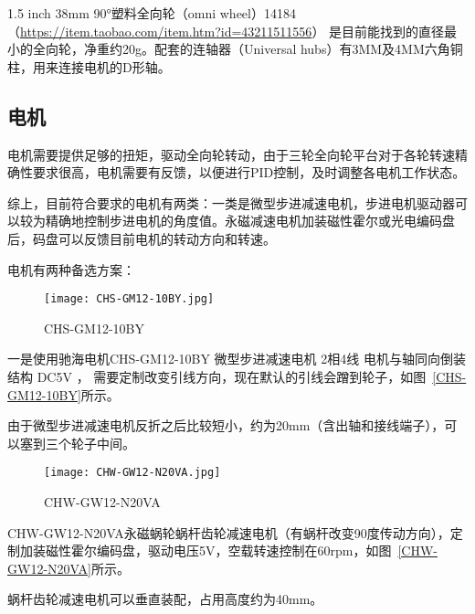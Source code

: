 1.5 inch 38mm 90°塑料全向轮（omni wheel）14184 （\url{https://item.taobao.com/item.htm?id=43211511556}） 是目前能找到的直径最小的全向轮，净重约20g。配套的连轴器（Universal hubs）有3MM及4MM六角铜柱，用来连接电机的D形轴。

\subsection{电机}

电机需要提供足够的扭矩，驱动全向轮转动，由于三轮全向轮平台对于各轮转速精确性要求很高，电机需要有反馈，以便进行PID控制，及时调整各电机工作状态。

综上，目前符合要求的电机有两类：一类是微型步进减速电机，步进电机驱动器可以较为精确地控制步进电机的角度值。永磁减速电机加装磁性霍尔或光电编码盘后，码盘可以反馈目前电机的转动方向和转速。

电机有两种备选方案：

\begin{figure}[htbp]
    \centering
    \texttt{[image: CHS-GM12-10BY.jpg]}
    \caption{CHS-GM12-10BY}
    \label{fig:CHS-GM12-10BY}
\end{figure}

一是使用驰海电机CHS-GM12-10BY 微型步进减速电机 2相4线 电机与轴同向倒装结构 DC5V ， 需要定制改变引线方向，现在默认的引线会蹭到轮子，如图~\ref{CHS-GM12-10BY}所示。

由于微型步进减速电机反折之后比较短小，约为20mm（含出轴和接线端子），可以塞到三个轮子中间。

\begin{figure}[htbp]
    \centering
    \texttt{[image: CHW-GW12-N20VA.jpg]}
    \caption{CHW-GW12-N20VA}
    \label{fig:CHW-GW12-N20VA}
\end{figure}

CHW-GW12-N20VA永磁蜗轮蜗杆齿轮减速电机（有蜗杆改变90度传动方向），定制加装磁性霍尔编码盘，驱动电压5V，空载转速控制在60rpm，如图~\ref{CHW-GW12-N20VA}所示。

蜗杆齿轮减速电机可以垂直装配，占用高度约为40mm。